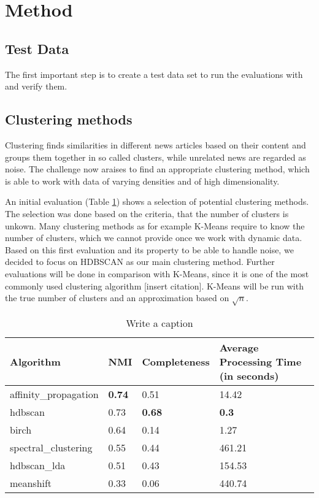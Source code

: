 \section{Method}



\subsection{Test Data}

The first important step is to create a test data set to run the evaluations with and verify them.


\subsection{Clustering methods}

Clustering finds similarities in different news articles based on their content and groups them together in so called clusters, while unrelated news are regarded as noise. The challenge now araises to find an appropriate clustering method, which is able to work with data of varying densities and of high dimensionality.

An initial evaluation (Table \ref{tab:first_evaluation}) shows a selection of potential clustering methods. The selection was done based on the criteria, that the number of clusters is unkown. Many clustering methods as for example K-Means require to know the number of clusters, which we cannot provide once we work with dynamic data. Based on this first evaluation and its property to be able to handle noise, we decided to focus on HDBSCAN as our main clustering method. Further evaluations will be done in comparison with K-Means, since it is one of the most commonly used clustering algorithm [insert citation]. K-Means will be run with the true number of clusters and an approximation based on $\sqrt{n}$.

\begin{table}[h]
    \centering
    \label{tab:first_evaluation}
    \begin{tabular}{|l|l|l|l|}
    \hline
    \textbf{Algorithm} & \textbf{NMI} & \textbf{Completeness}  & \textbf{Average Processing Time (in seconds)} \\ \hline
    affinity\_propagation & \textbf{0.74} & 0.51 & 14.42 \\ \hline
    hdbscan & 0.73 & \textbf{0.68} & \textbf{0.3} \\ \hline
    birch & 0.64 & 0.14 & 1.27 \\ \hline
    spectral\_clustering & 0.55 & 0.44  & 461.21 \\ \hline
    hdbscan\_lda & 0.51 & 0.43 & 154.53 \\ \hline
    meanshift & 0.33 & 0.06  & 440.74 \\ \hline
    \end{tabular}
    \caption{Write a caption}
\end{table}

